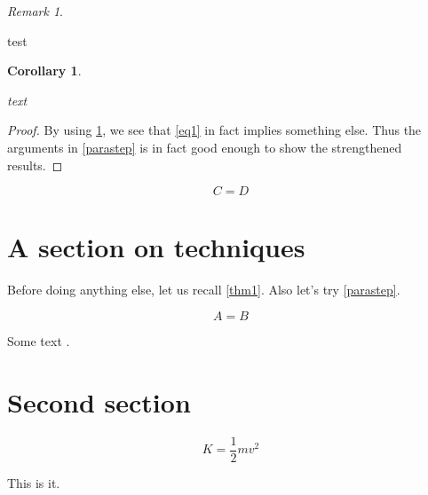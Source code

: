 \documentclass[amssymb,amsfonts]{amsart}
\makeatletter
\theoremstyle{plain} %
\newtheorem{cor}[thm]{Corollary}
\theoremstyle{definition} %
\theoremstyle{remark} %
\newtheorem{rmk}[thm]{Remark}
\newenvironment{pfof}[1]%
	{\def\wwwnotes@pfofctr{#1}\begin{proof}}%
	{\end{proof}}
\makeatother
\begin{document}
\begin{rmk}\label{rmk1}
	\lipsum[27]

	test
\end{rmk}

\begin{cor}\label{cor1}
	\lipsum[24]

	text
\end{cor}

\begin{pfof}{cor1}
	By using \ref{rmk1}, we see that \ref{eq1} in fact implies something else. Thus the arguments in \ref{parastep} is in fact good enough to show the strengthened results. 
\end{pfof}

\begin{equation}
	C = D
\end{equation}

\section{A section on techniques}

Before doing anything else, let us recall \ref{thm1}. Also let's try \ref{parastep}.

\lipsum[2]

\begin{equation}
	A = B
\end{equation}

\lipsum[3-8]




\lipsum[5-9]

Some text \cite{Wong2009}.


\section{Second section}


\lipsum[10-23]

\begin{equation}
K = \frac12 mv^2
\end{equation}

This is it.




\end{document}
